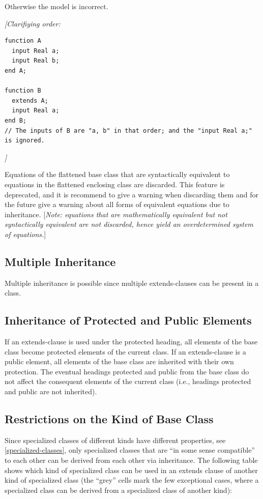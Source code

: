\documentclass[10pt,a4paper]{report}
\def\doublelabel#1{\label{#1}\hypertarget{#1}{}}
\begin{document}
Otherwise the model is incorrect.

\emph{{[}Clarifiying order:}
\begin{lstlisting}[language=modelica]
function A
  input Real a;
  input Real b; 
end A;

function B
  extends A;
  input Real a;
end B;
// The inputs of B are "a, b" in that order; and the "input Real a;" is ignored.
\end{lstlisting}
\emph{{]}}

Equations of the flattened base class that are syntactically equivalent
to equations in the flattened enclosing class are discarded. This
feature is deprecated, and it is recommend to give a warning when
discarding them and for the future give a warning about all forms of
equivalent equations due to inheritance. {[}\emph{Note: equations that
are mathematically equivalent but not syntactically equivalent are not
discarded, hence yield an overdetermined system of equations.}{]}

\subsection{Multiple Inheritance}\doublelabel{multiple-inheritance}

Multiple inheritance is possible since multiple extends-clauses can be
present in a class.

\subsection{Inheritance of Protected and Public Elements}\doublelabel{inheritance-of-protected-and-public-elements}

If an extends-clause is used under the protected heading, all elements
of the base class become protected elements of the current class. If an
extends-clause is a public element, all elements of the base class are
inherited with their own protection. The eventual headings protected and
public from the base class do not affect the consequent elements of the
current class (i.e., headings protected and public are not inherited).

\subsection{Restrictions on the Kind of Base Class}\doublelabel{restrictions-on-the-kind-of-base-class}

Since specialized classes of different kinds have different properties,
see \ref{specialized-classes}, only specialized classes that are ``in some sense
compatible'' to each other can be derived from each other via
inheritance. The following table shows which kind of specialized class
can be used in an extends clause of another kind of specialized class
(the ``grey'' cells mark the few exceptional cases, where a specialized
class can be derived from a specialized class of another kind):
\end{document}
